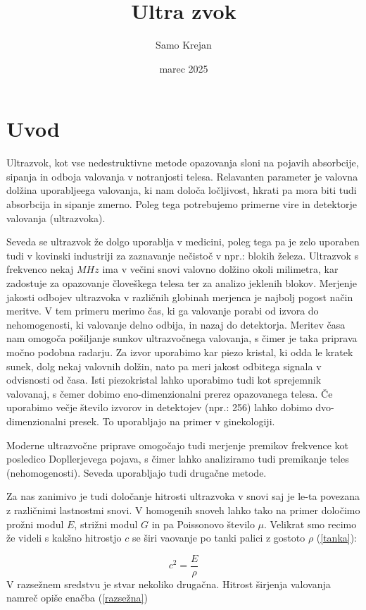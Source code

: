 \documentclass[10pt]{article}
\title{Ultra zvok}
\author{Samo Krejan}
\date{marec 2025}
\begin{document}
\maketitle

\section{Uvod}

Ultrazvok, kot vse nedestruktivne metode opazovanja sloni na pojavih absorbcije, sipanja in odboja valovanja v notranjosti telesa. Relavanten parameter je valovna dolžina uporabljeega valovanja, ki nam določa ločljivost, hkrati pa mora biti tudi absorbcija in sipanje zmerno. Poleg tega potrebujemo primerne vire in detektorje valovanja (ultrazvoka).

Seveda se ultrazvok že dolgo uporablja v medicini, poleg tega pa je zelo uporaben tudi v kovinski industriji za zaznavanje nečistoč v npr.: blokih železa. Ultrazvok s frekvenco nekaj $MHz$ ima v večini snovi valovno dolžino okoli milimetra, kar zadostuje za opazovanje človeškega telesa ter za analizo jeklenih blokov. Merjenje jakosti odbojev ultrazvoka v različnih globinah merjenca je najbolj pogost način meritve. V tem primeru merimo čas, ki ga valovanje porabi od izvora do nehomogenosti, ki valovanje delno odbija, in nazaj do detektorja. Meritev časa nam omogoča pošiljanje sunkov ultrazvočnega valovanja, s čimer je taka priprava močno podobna radarju. Za izvor uporabimo kar piezo kristal, ki odda le kratek sunek, dolg nekaj valovnih dolžin, nato pa meri jakost odbitega signala v odvisnosti od časa. Isti piezokristal lahko uporabimo tudi kot sprejemnik valovanaj, s čemer dobimo eno-dimenzionalni prerez opazovanega telesa. Če uporabimo večje število izvorov in detektojev (npr.: 256) lahko dobimo dvo-dimenzionalni presek. To uporabljajo na primer v ginekologiji.

Moderne ultrazvočne priprave omogočajo tudi merjenje premikov frekvence kot posledico Dopllerjevega pojava, s čimer lahko analiziramo tudi premikanje teles (nehomogenosti). Seveda uporabljajo tudi drugačne metode.

Za nas zanimivo je tudi določanje hitrosti ultrazvoka v snovi saj je le-ta povezana z različnimi lastnostmi snovi. V homogenih snoveh lahko tako na primer določimo prožni modul $E$, strižni modul $G$ in pa Poissonovo število $\mu$. Velikrat smo recimo že videli s kakšno hitrostjo $c$ se širi vaovanje po tanki palici z gostoto $\rho$ (\ref{tanka}):

\begin{equation}
    c^{2} = \frac{E}{\rho}
    \label{tanka}
\end{equation}
V razsežnem sredstvu je stvar nekoliko drugačna. Hitrost širjenja valovanja namreč opiše enačba (\ref{razsežna})
\end{document}
